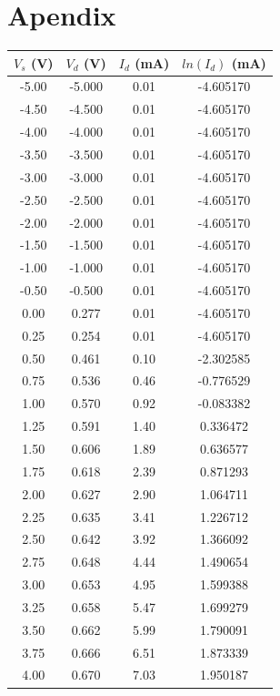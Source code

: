 \documentclass{article}
\begin{document}
\section{Apendix}
\label{sec:appendix}

\begin{table}[hbtp]
  \centering
  \begin{tabular}{cccc}
    $V_s$ (V) & $V_d$ (V) & $I_d$ (mA) & $ln(I_d)$ (mA) \\
    \hline
    -5.00 & -5.000 & 0.01 & -4.605170 \\
    -4.50 & -4.500 & 0.01 & -4.605170 \\
    -4.00 & -4.000 & 0.01 & -4.605170 \\
    -3.50 & -3.500 & 0.01 & -4.605170 \\
    -3.00 & -3.000 & 0.01 & -4.605170 \\
    -2.50 & -2.500 & 0.01 & -4.605170 \\
    -2.00 & -2.000 & 0.01 & -4.605170 \\
    -1.50 & -1.500 & 0.01 & -4.605170 \\
    -1.00 & -1.000 & 0.01 & -4.605170 \\
    -0.50 & -0.500 & 0.01 & -4.605170 \\
    0.00 & 0.277 & 0.01 & -4.605170 \\
    0.25 & 0.254 & 0.01 & -4.605170 \\
    0.50 & 0.461 & 0.10 & -2.302585 \\
    0.75 & 0.536 & 0.46 & -0.776529 \\
    1.00 & 0.570 & 0.92 & -0.083382 \\
    1.25 & 0.591 & 1.40 & 0.336472 \\
    1.50 & 0.606 & 1.89 & 0.636577 \\
    1.75 & 0.618 & 2.39 & 0.871293 \\
    2.00 & 0.627 & 2.90 & 1.064711 \\
    2.25 & 0.635 & 3.41 & 1.226712 \\
    2.50 & 0.642 & 3.92 & 1.366092 \\
    2.75 & 0.648 & 4.44 & 1.490654 \\
    3.00 & 0.653 & 4.95 & 1.599388 \\
    3.25 & 0.658 & 5.47 & 1.699279 \\
    3.50 & 0.662 & 5.99 & 1.790091 \\
    3.75 & 0.666 & 6.51 & 1.873339 \\
    4.00 & 0.670 & 7.03 & 1.950187 \\

\end{tabular}
\end{table}
\end{document}
